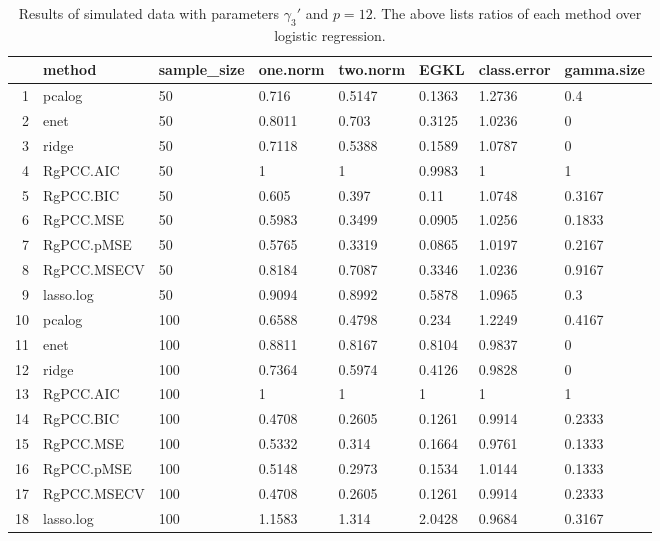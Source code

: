 \begin{table}[ht]
\centering
\begin{tabular}{rlllllll}
  \hline
 & method & sample\_size & one.norm & two.norm & EGKL & class.error & gamma.size \\ 
  \hline
1 & pcalog & 50 & 0.716 & 0.5147 & 0.1363 & 1.2736 & 0.4 \\ 
  2 & enet & 50 & 0.8011 & 0.703 & 0.3125 & 1.0236 & 0 \\ 
  3 & ridge & 50 & 0.7118 & 0.5388 & 0.1589 & 1.0787 & 0 \\ 
  4 & RgPCC.AIC & 50 & 1 & 1 & 0.9983 & 1 & 1 \\ 
  5 & RgPCC.BIC & 50 & 0.605 & 0.397 & 0.11 & 1.0748 & 0.3167 \\ 
  6 & RgPCC.MSE & 50 & 0.5983 & 0.3499 & 0.0905 & 1.0256 & 0.1833 \\ 
  7 & RgPCC.pMSE & 50 & 0.5765 & 0.3319 & 0.0865 & 1.0197 & 0.2167 \\ 
  8 & RgPCC.MSECV & 50 & 0.8184 & 0.7087 & 0.3346 & 1.0236 & 0.9167 \\ 
  9 & lasso.log & 50 & 0.9094 & 0.8992 & 0.5878 & 1.0965 & 0.3 \\ 
  10 & pcalog & 100 & 0.6588 & 0.4798 & 0.234 & 1.2249 & 0.4167 \\ 
  11 & enet & 100 & 0.8811 & 0.8167 & 0.8104 & 0.9837 & 0 \\ 
  12 & ridge & 100 & 0.7364 & 0.5974 & 0.4126 & 0.9828 & 0 \\ 
  13 & RgPCC.AIC & 100 & 1 & 1 & 1 & 1 & 1 \\ 
  14 & RgPCC.BIC & 100 & 0.4708 & 0.2605 & 0.1261 & 0.9914 & 0.2333 \\ 
  15 & RgPCC.MSE & 100 & 0.5332 & 0.314 & 0.1664 & 0.9761 & 0.1333 \\ 
  16 & RgPCC.pMSE & 100 & 0.5148 & 0.2973 & 0.1534 & 1.0144 & 0.1333 \\ 
  17 & RgPCC.MSECV & 100 & 0.4708 & 0.2605 & 0.1261 & 0.9914 & 0.2333 \\ 
  18 & lasso.log & 100 & 1.1583 & 1.314 & 2.0428 & 0.9684 & 0.3167 \\ 
   \hline
\end{tabular}
\caption{Results of simulated data with parameters $\gamma_3'$ and $p =12$. The above lists ratios of each method over logistic regression.} 
\label{fig-3'-nonlead-new-algo-12-metrics-pratio}
\end{table}
